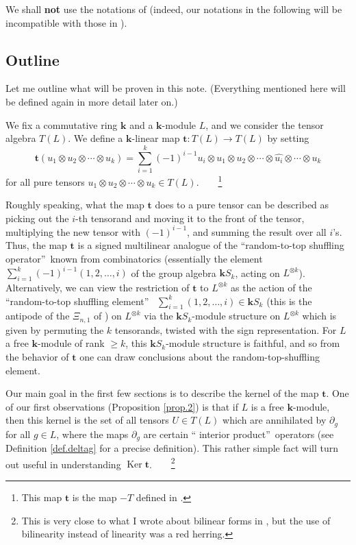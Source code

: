 \documentclass[numbers=enddot,12pt,final,onecolumn,notitlepage]{scrartcl}%
\theoremstyle{definition}
\let\sumnonlimits\sum
\renewcommand{\sum}{\sumnonlimits\limits}
\begin{document}
We shall \textbf{not} use the notations of \cite{mo} (indeed, our notations in
the following will be incompatible with those in \cite{mo}).

\subsection{Outline}

Let me outline what will be proven in this note. (Everything mentioned here
will be defined again in more detail later on.)

We fix a commutative ring $\mathbf{k}$ and a $\mathbf{k}$-module $L$, and we
consider the tensor algebra $T\left(  L\right)  $. We define a $\mathbf{k}%
$-linear map $\mathbf{t}:T\left(  L\right)  \rightarrow T\left(  L\right)  $
by setting%
\[
\mathbf{t}\left(  u_{1}\otimes u_{2}\otimes\cdots\otimes u_{k}\right)
=\sum_{i=1}^{k}\left(  -1\right)  ^{i-1}u_{i}\otimes u_{1}\otimes u_{2}%
\otimes\cdots\otimes\widehat{u_{i}}\otimes\cdots\otimes u_{k}%
\]
for all pure tensors $u_{1}\otimes u_{2}\otimes\cdots\otimes u_{k}\in T\left(
L\right)  $.\ \ \ \ \footnote{This map $\mathbf{t}$ is the map $-T$ defined in
\cite{mo}.}

Roughly speaking, what the map $\mathbf{t}$ does to a pure tensor can be
described as picking out the $i$-th tensorand and moving it to the front of
the tensor, multiplying the new tensor with $\left(  -1\right)  ^{i-1}$, and
summing the result over all $i$'s. Thus, the map $\mathbf{t}$ is a signed
multilinear analogue of the \textquotedblleft random-to-top shuffling
operator\textquotedblright\ known from combinatorics (essentially the element
$\sum_{i=1}^{k}\left(  -1\right)  ^{i-1}\left(  1,2,\ldots,i\right)  $ of the
group algebra $\mathbf{k}S_{k}$, acting on $L^{\otimes k}$). Alternatively, we
can view the restriction of $\mathbf{t}$ to $L^{\otimes k}$ as the action of
the \textquotedblleft random-to-top shuffling element\textquotedblright%
\ $\sum_{i=1}^{k}\left(  1,2,\ldots,i\right)  \in\mathbf{k}S_{k}$ (this is the
antipode of the $\Xi_{n,1}$ of \cite{schocker}) on $L^{\otimes k}$ via the
$\mathbf{k}S_{k}$-module structure on $L^{\otimes k}$ which is given by
permuting the $k$ tensorands, twisted with the sign representation. For $L$ a
free $\mathbf{k}$-module of rank $\geq k$, this $\mathbf{k}S_{k}$-module
structure is faithful, and so from the behavior of $\mathbf{t}$ one can draw
conclusions about the random-top-shuffling element.

Our main goal in the first few sections is to describe the kernel of the map
$\mathbf{t}$. One of our first observations (Proposition \ref{prop.2}) is that
if $L$ is a free $\mathbf{k}$-module, then this kernel is the set of all
tensors $U\in T\left(  L\right)  $ which are annihilated by $\partial_{g}$ for
all $g\in L$, where the maps $\partial_{g}$ are certain \textquotedblleft
interior product\textquotedblright\ operators (see Definition \ref{def.deltag}
for a precise definition). This rather simple fact will turn out useful in
understanding $\operatorname*{Ker}\mathbf{t}$.\ \ \ \ \footnote{This is very
close to what I wrote about bilinear forms in \cite{mo}, but the use of
bilinearity instead of linearity was a red herring.}
\end{document}
